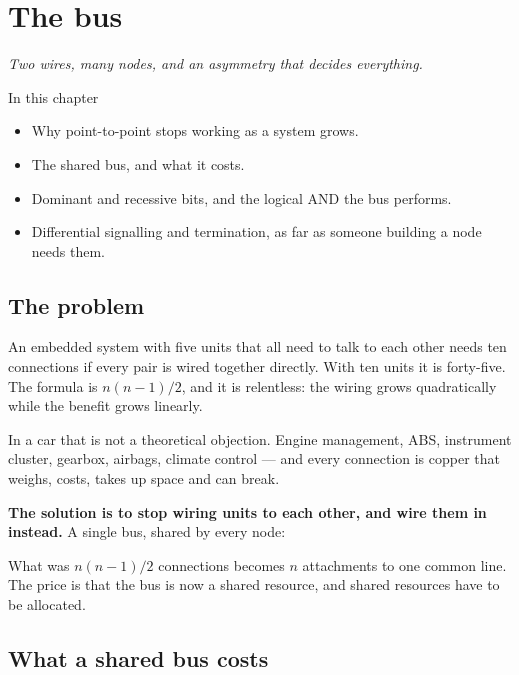 \chapter{The bus}
\label{ch:buss}

{\large\itshape Two wires, many nodes, and an asymmetry that decides everything.\par}

\begin{chapterbox}{In this chapter}
\begin{itemize}
  \item Why point-to-point stops working as a system grows.
  \item The shared bus, and what it costs.
  \item Dominant and recessive bits, and the logical AND the bus performs.
  \item Differential signalling and termination, as far as someone building a node needs them.
\end{itemize}
\end{chapterbox}

\section{The problem}

An embedded system with five units that all need to talk to each other needs ten connections if
every pair is wired together directly. With ten units it is forty-five. The formula is $n(n-1)/2$,
and it is relentless: the wiring grows quadratically while the benefit grows linearly.

In a car that is not a theoretical objection. Engine management, ABS, instrument cluster,
gearbox, airbags, climate control --- and every connection is copper that weighs, costs, takes up
space and can break.

\textbf{The solution is to stop wiring units to each other, and wire them in instead.} A single
bus, shared by every node:


What was $n(n-1)/2$ connections becomes $n$ attachments to one common line. The price is that the
bus is now a shared resource, and shared resources have to be allocated.

\section{What a shared bus costs}

